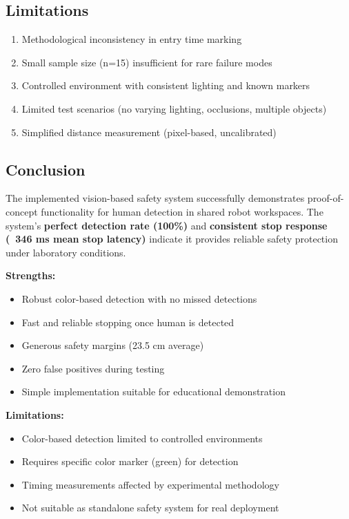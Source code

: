 \documentclass[11pt,letterpaper]{article}
\begin{document}
\subsection{Limitations}

\begin{enumerate}[leftmargin=*]
    \item Methodological inconsistency in entry time marking
    \item Small sample size (n=15) insufficient for rare failure modes
    \item Controlled environment with consistent lighting and known markers
    \item Limited test scenarios (no varying lighting, occlusions, multiple objects)
    \item Simplified distance measurement (pixel-based, uncalibrated)
\end{enumerate}

\subsection{Conclusion}

The implemented vision-based safety system successfully demonstrates proof-of-concept functionality for human detection in shared robot workspaces. The system's \textbf{perfect detection rate (100\%)} and \textbf{consistent stop response (~346 ms mean stop latency)} indicate it provides reliable safety protection under laboratory conditions.

\textbf{Strengths:}
\begin{itemize}[leftmargin=*]
    \item Robust color-based detection with no missed detections
    \item Fast and reliable stopping once human is detected
    \item Generous safety margins (23.5 cm average)
    \item Zero false positives during testing
    \item Simple implementation suitable for educational demonstration
\end{itemize}

\textbf{Limitations:}
\begin{itemize}[leftmargin=*]
    \item Color-based detection limited to controlled environments
    \item Requires specific color marker (green) for detection
    \item Timing measurements affected by experimental methodology
    \item Not suitable as standalone safety system for real deployment
\end{itemize}
\end{document}
